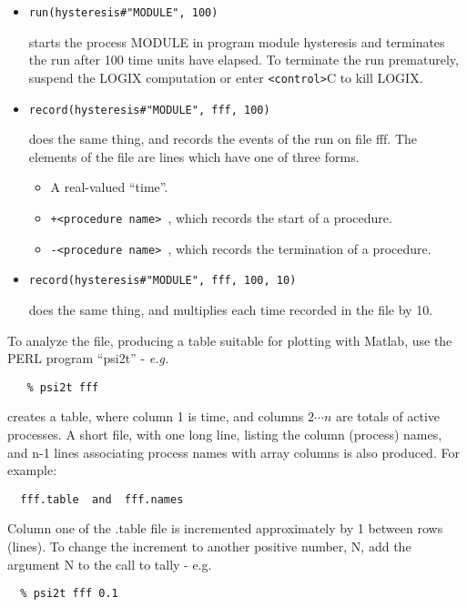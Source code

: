 \begin{itemize}
\item
  \verb+run(hysteresis#"MODULE", 100)+

\noindent
starts the process  MODULE  in program module  hysteresis  and
terminates the run after 100 time units have elapsed.  To 
terminate the run prematurely, suspend the LOGIX computation
or enter  \verb+<control>+C  to kill LOGIX.

\item
  \verb+record(hysteresis#"MODULE", fff, 100)+

\noindent
does the same thing, and records the events of the run on file fff.
The elements of the file are lines which have one of three forms.
\begin{itemize}
\item
A real-valued ``time''.
\item
\verb:+<procedure name> :, which records the start of a procedure.
\item
\verb:-<procedure name> :, which records the termination of a procedure.
\end{itemize}

\item
  \verb+record(hysteresis#"MODULE", fff, 100, 10)+

\noindent
does the same thing, and multiplies each time recorded in the file
by 10.
\end{itemize}

\noindent
To analyze the file, producing a table suitable for plotting with
Matlab, use the PERL program ``psi2t'' - {\em e.g.}

\begin{verbatim}
   % psi2t fff
\end{verbatim}

creates a table, where column 1 is time, and columns $2 \cdots n$ are totals
of active processes.  A short file, with one long line, listing the
column (process) names, and n-1 lines associating process names with
array columns is also produced.  For example:

\begin{verbatim}
  fff.table  and  fff.names
\end{verbatim}

\noindent
Column one of the .table file is incremented approximately by 1 between
rows (lines).  To change the increment to another positive number, N,
add the argument N to the call to tally - e.g.

\begin{verbatim}
  % psi2t fff 0.1
\end{verbatim}

